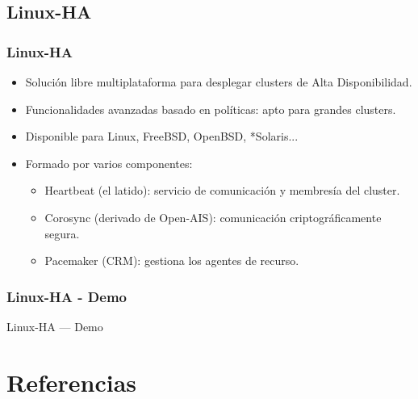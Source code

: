 \documentclass{beamer}
\begin{document}

\subsection{Linux-HA}
\begin{frame}
\frametitle{Linux-HA}

\begin{itemize}
\item Solución libre \alert{multiplataforma} para desplegar clusters de Alta Disponibilidad.
\item Funcionalidades avanzadas basado en políticas: apto para grandes clusters.
\item Disponible para Linux, FreeBSD, OpenBSD, *Solaris...
\item Formado por varios componentes:
	\begin{itemize}
	\item \alert{Heartbeat} (el latido): servicio de comunicación y membresía del cluster.
	\item \alert{Corosync} (derivado de Open-AIS): comunicación criptográficamente segura.
	\item \alert{Pacemaker} (CRM): gestiona los agentes de recurso.
	\end{itemize}
\end{itemize}

\end{frame}


\begin{frame}
\frametitle{Linux-HA - Demo}

\begin{center}

\LARGE Linux-HA --- Demo

\end{center}

\end{frame}



\section{Referencias}
\end{document}
